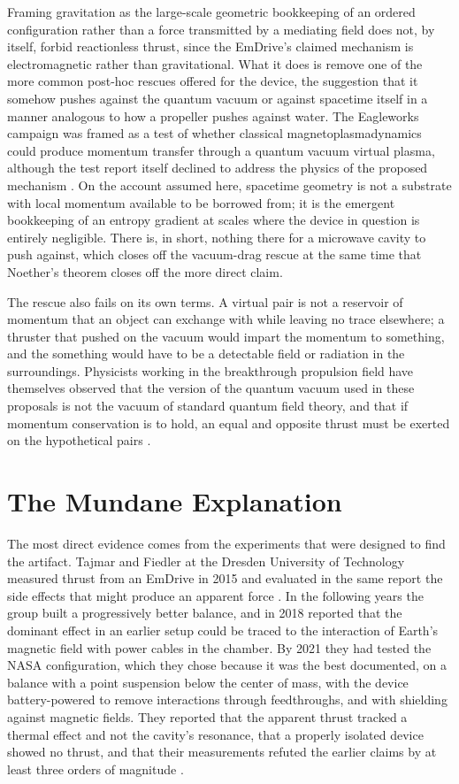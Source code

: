 \documentclass[11pt]{article}
\begin{document}
Framing gravitation as the large-scale geometric bookkeeping of an ordered configuration rather than a force transmitted by a mediating field does not, by itself, forbid reactionless thrust, since the EmDrive's claimed mechanism is electromagnetic rather than gravitational. What it does is remove one of the more common post-hoc rescues offered for the device, the suggestion that it somehow pushes against the quantum vacuum or against spacetime itself in a manner analogous to how a propeller pushes against water. The Eagleworks campaign was framed as a test of whether classical magnetoplasmadynamics could produce momentum transfer through a quantum vacuum virtual plasma, although the test report itself declined to address the physics of the proposed mechanism \cite{B2014}. On the account assumed here, spacetime geometry is not a substrate with local momentum available to be borrowed from; it is the emergent bookkeeping of an entropy gradient at scales where the device in question is entirely negligible. There is, in short, nothing there for a microwave cavity to push against, which closes off the vacuum-drag rescue at the same time that Noether's theorem closes off the more direct claim.

The rescue also fails on its own terms. A virtual pair is not a reservoir of momentum that an object can exchange with while leaving no trace elsewhere; a thruster that pushed on the vacuum would impart the momentum to something, and the something would have to be a detectable field or radiation in the surroundings. Physicists working in the breakthrough propulsion field have themselves observed that the version of the quantum vacuum used in these proposals is not the vacuum of standard quantum field theory, and that if momentum conservation is to hold, an equal and opposite thrust must be exerted on the hypothetical pairs \cite{F2016}.

\section{The Mundane Explanation}

The most direct evidence comes from the experiments that were designed to find the artifact. Tajmar and Fiedler at the Dresden University of Technology measured thrust from an EmDrive in 2015 and evaluated in the same report the side effects that might produce an apparent force \cite{TF2015}. In the following years the group built a progressively better balance, and in 2018 reported that the dominant effect in an earlier setup could be traced to the interaction of Earth's magnetic field with power cables in the chamber. By 2021 they had tested the NASA configuration, which they chose because it was the best documented, on a balance with a point suspension below the center of mass, with the device battery-powered to remove interactions through feedthroughs, and with shielding against magnetic fields. They reported that the apparent thrust tracked a thermal effect and not the cavity's resonance, that a properly isolated device showed no thrust, and that their measurements refuted the earlier claims by at least three orders of magnitude \cite{TNW2022}.
\end{document}
